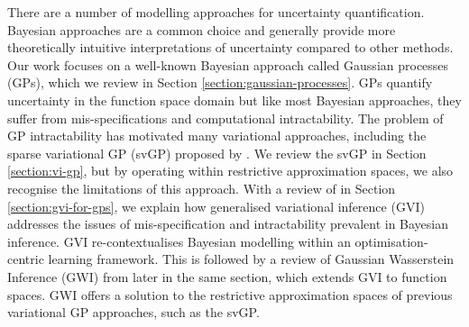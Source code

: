 \documentclass{article}
\numberwithin{equation}{section}
\begin{document}

There are a number of modelling approaches for uncertainty quantification. 
Bayesian approaches are a common choice and generally provide more theoretically intuitive interpretations of uncertainty compared to other methods. 
Our work focuses on a well-known Bayesian approach called Gaussian processes (GPs), which we review in Section \ref{section:gaussian-processes}.
GPs quantify uncertainty in the function space domain but like most Bayesian approaches, they suffer from mis-specifications and computational intractability. 
The problem of GP intractability has motivated many variational approaches, including the sparse variational GP (svGP) proposed by \cite{titsias2009variational}.
We review the svGP in Section \ref{section:vi-gp}, but by operating within restrictive approximation spaces, we also recognise the limitations of this approach. 
With a review of \cite{knoblauch2022optimization} in Section \ref{section:gvi-for-gps}, we explain how generalised variational inference (GVI) addresses the issues of mis-specification and intractability prevalent in Bayesian inference.
GVI re-contextualises Bayesian modelling within an optimisation-centric learning framework.
This is followed by a review of Gaussian Wasserstein Inference (GWI) from \cite{wild2022generalized} later in the same section, which extends GVI to function spaces.
GWI offers a solution to the restrictive approximation spaces of previous variational GP approaches, such as the svGP.
\end{document}
